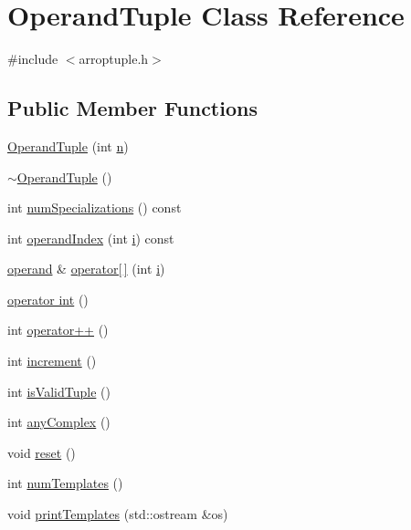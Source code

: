 \hypertarget{classOperandTuple}{}\section{Operand\+Tuple Class Reference}
\label{classOperandTuple}


{\ttfamily \#include $<$arroptuple.\+h$>$}

\subsection*{Public Member Functions}
\begin{DoxyCompactItemize}
\item 
\hyperlink{classOperandTuple_af6fd7f3956a21cdca80dc9444533ec53}{Operand\+Tuple} (int \hyperlink{indexexpr_8h_ab427e2e2b4d6cec55fa088ea2a692ace}{n})
\item 
\hyperlink{classOperandTuple_a509132d109793e4a21e07ba80bbf73df}{$\sim$\+Operand\+Tuple} ()
\item 
int \hyperlink{classOperandTuple_a27c1b58866b219420fe71abedc09386d}{num\+Specializations} () const 
\item 
int \hyperlink{classOperandTuple_a8009866e71d1237e04c99ccf7133f0e9}{operand\+Index} (int \hyperlink{indexexpr_8h_aabd77643995707c185e95c8cb2782c81}{i}) const 
\item 
\hyperlink{classoperand}{operand} \& \hyperlink{classOperandTuple_a9c721b4ed8a871c0f66f54852501ccea}{operator\mbox{[}$\,$\mbox{]}} (int \hyperlink{indexexpr_8h_aabd77643995707c185e95c8cb2782c81}{i})
\item 
\hyperlink{classOperandTuple_a12ff861b7814bf051ddc1627f57768da}{operator int} ()
\item 
int \hyperlink{classOperandTuple_ad99ec5e23042e65727d8dbd76f09f661}{operator++} ()
\item 
int \hyperlink{classOperandTuple_a165bfc973ac7afe50fafb974d3a40719}{increment} ()
\item 
int \hyperlink{classOperandTuple_a2941c29584aee3a7f5793695f9e92ca4}{is\+Valid\+Tuple} ()
\item 
int \hyperlink{classOperandTuple_a95affb4bef0ae31c59da95dd5081aada}{any\+Complex} ()
\item 
void \hyperlink{classOperandTuple_a5eb486204afa29098ffdf47091c53b1d}{reset} ()
\item 
int \hyperlink{classOperandTuple_a1bfb53e8c4fd77bcf90dc5350806f396}{num\+Templates} ()
\item 
void \hyperlink{classOperandTuple_a49794632491e2da5f73f1abe7efb12ea}{print\+Templates} (std\+::ostream \&os)

\end{DoxyCompactItemize}
